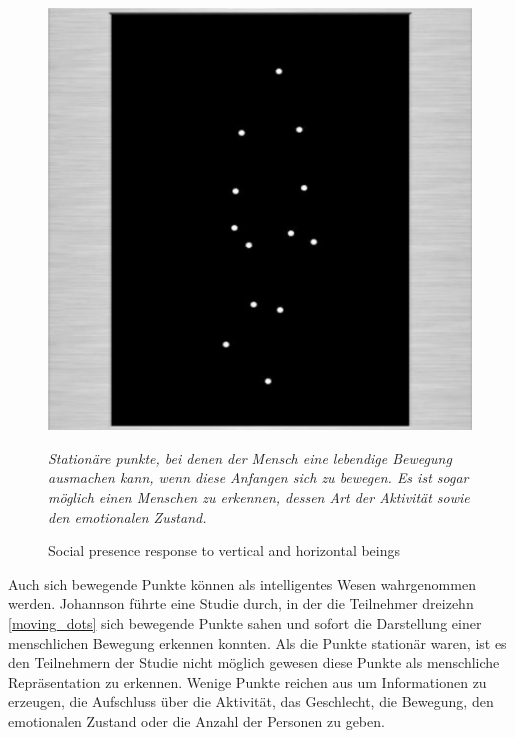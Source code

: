 \documentclass[a4paper,11pt]{article}%
\renewcommand{\\}{\vspace*{0.5\baselineskip} \newline}
\begin{document}
\begin{figure}[H]
		\begin{footnotesize}
		\centering
			\includegraphics[scale= 0.5]{Abbildungen/moving_dots.JPG}
			\caption[Abbildung 1]{Social presence response to vertical and
horizontal beings}
			\textit{Stationäre punkte, bei denen der Mensch eine lebendige Bewegung ausmachen kann, wenn diese Anfangen sich zu bewegen. Es ist sogar möglich einen Menschen zu erkennen, dessen Art der Aktivität sowie den emotionalen Zustand. \citep{biocca2002defining} \citep[p.76-89]{johansson1975visual}}

			\label{moving_dots}
		\end{footnotesize}
	\end{figure}

Auch sich bewegende Punkte können als intelligentes Wesen wahrgenommen werden. Johannson \citep[p.76-89]{johansson1975visual} führte eine Studie durch, in der die Teilnehmer dreizehn \autoref{moving_dots} sich bewegende Punkte sahen und sofort die Darstellung einer menschlichen Bewegung erkennen konnten. Als die Punkte stationär waren, ist es den Teilnehmern der Studie nicht möglich gewesen diese Punkte als menschliche Repräsentation zu erkennen. Wenige Punkte reichen aus um Informationen zu erzeugen, die Aufschluss über die Aktivität, das Geschlecht, die Bewegung, den emotionalen Zustand oder die Anzahl der Personen zu geben.
\end{document}
